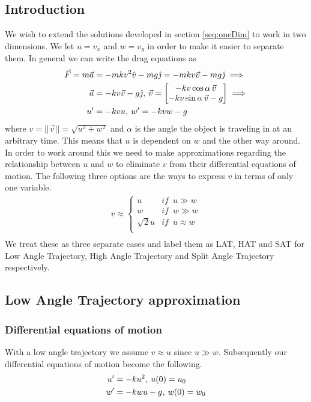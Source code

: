 \documentclass[%
aip,
jmp,
amsmath,amssymb,
reprint,%
]{revtex4-1}
\newcommand{\comma}{\hspace{0.1mm},\hspace{0.7mm}}
\begin{document}
	\subsection{Introduction}
	We wish to extend the solutions developed in section \ref{seq:oneDim} to work in two dimensions. We let $u = v_x$ and $w = v_y$ in order to make it easier to separate them. In general we can write the drag equations as
	\begin{align}\nonumber
		\vec{F} = m\vec{a} &= -mkv^2\hat{v} - mg\hat{\jmath} = -mkv\vec{v}-mg\hat{\jmath} \implies\\\nonumber
		\vec{a} &= -kv\vec{v}-g\hat{\jmath}\comma \vec{v} = \begin{bmatrix}
			-kv\cos\alpha\,\vec{v}\\
			-kv\sin\alpha\,\vec{v}-g\\
		\end{bmatrix}\implies  \\\nonumber
		u' &= -kvu \comma w' = -kvw-g\,\,\,\,\,
	\end{align}
	where $v = ||\vec{v}|| = \sqrt{u^2+w^2}$ and $\alpha$ is the angle the object is traveling in at an arbitrary time. This means that $u$ is dependent on $w$ and the other way around. In order to work around this we need to make approximations regarding the relationship between $u$ and $w$ to eliminate $v$ from their differential equations of motion. The following three options are the ways to express $v$ in terms of only one variable.
	\begin{align}\nonumber
		v \approx
		\begin{cases}
			u			&if\,\,\, u \gg w\\
			w			&if\,\,\, w \gg w\\
			\sqrt{2}u	&if\,\,\, u \approx w\\
		\end{cases}\\\nonumber
	\end{align}
	We treat these as three separate cases and label them as LAT, HAT and SAT for Low Angle Trajectory, High Angle Trajectory and Split Angle Trajectory respectively.
	\subsection{Low Angle Trajectory approximation}\label{seq:lat}
	\subsubsection{Differential equations of motion}
	With a low angle trajectory we assume $v \approx u$ since $u \gg w$. Subsequently our differential equations of motion become the following.
	\begin{align}\label{eq:twoDimEMOLATU}
		u' &= -ku^2\comma u(0) = u_0\\\label{eq:twoDimEMOLATW}
		w' &= -kwu-g\comma w(0) = w_0
	\end{align}
\end{document}
